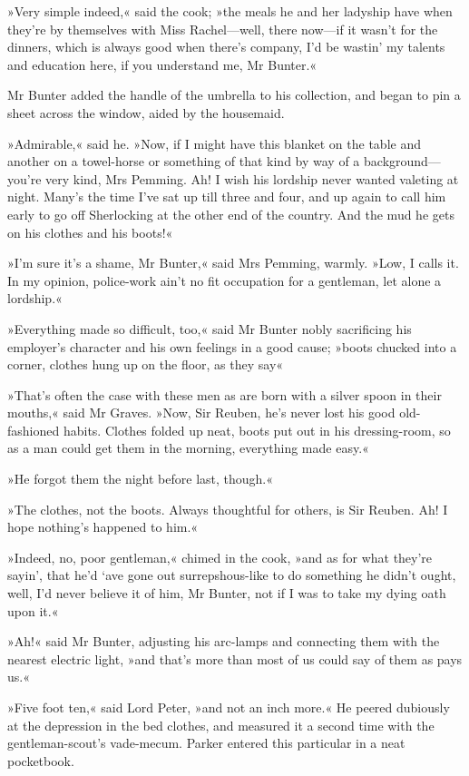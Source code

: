 »Very simple indeed,« said the cook; »the meals he and her ladyship have when they're by themselves with Miss Rachel—well, there now—if it wasn't for the dinners, which is always good when there's company, I'd be wastin' my talents and education here, if you understand me, Mr Bunter.«

Mr Bunter added the handle of the umbrella to his collection, and began to pin a sheet across the window, aided by the housemaid.

»Admirable,« said he. »Now, if I might have this blanket on the table and another on a towel-horse or something of that kind by way of a background—you're very kind, Mrs Pemming\textellipsis . Ah! I wish his lordship never wanted valeting at night. Many's the time I've sat up till three and four, and up again to call him early to go off Sherlocking at the other end of the country. And the mud he gets on his clothes and his boots!«

»I'm sure it's a shame, Mr Bunter,« said Mrs Pemming, warmly. »Low, I calls it. In my opinion, police-work ain't no fit occupation for a gentleman, let alone a lordship.«

»Everything made so difficult, too,« said Mr Bunter nobly sacrificing his employer's character and his own feelings in a good cause; »boots chucked into a corner, clothes hung up on the floor, as they say\longdash«

»That's often the case with these men as are born with a silver spoon in their mouths,« said Mr Graves. »Now, Sir Reuben, he's never lost his good old-fashioned habits. Clothes folded up neat, boots put out in his dressing-room, so as a man could get them in the morning, everything made easy.«

»He forgot them the night before last, though.«

»The clothes, not the boots. Always thoughtful for others, is Sir Reuben. Ah! I hope nothing's happened to him.«

»Indeed, no, poor gentleman,« chimed in the cook, »and as for what they're sayin', that he'd `ave gone out surrepshous-like to do something he didn't ought, well, I'd never believe it of him, Mr Bunter, not if I was to take my dying oath upon it.«

»Ah!« said Mr Bunter, adjusting his arc-lamps and connecting them with the nearest electric light, »and that's more than most of us could say of them as pays us.«

»Five foot ten,« said Lord Peter, »and not an inch more.« He peered dubiously at the depression in the bed clothes, and measured it a second time with the gentleman-scout's vade-mecum. Parker entered this particular in a neat pocketbook.

